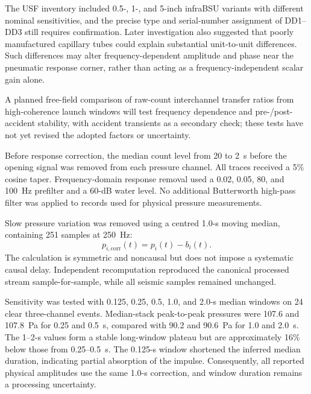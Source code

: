 \documentclass[]{seismica}
\begin{document}
The USF inventory included 0.5-, 1-, and 5-inch infraBSU variants with
different nominal sensitivities, and the precise type and serial-number
assignment of DD1--DD3 still requires confirmation. Later investigation also
suggested that poorly manufactured capillary tubes could explain substantial
unit-to-unit differences. Such differences may alter frequency-dependent
amplitude and phase near the pneumatic response corner, rather than acting as
a frequency-independent scalar gain alone.

A planned free-field comparison of raw-count interchannel transfer ratios
from high-coherence launch windows will test frequency dependence and
pre-/post-accident stability, with accident transients as a secondary check;
these tests have not yet revised the adopted factors or uncertainty.


Before response correction, the median count level from 20 to 2~s before the
opening signal was removed from each pressure channel. All traces received a
5\% cosine taper. Frequency-domain response removal used a 0.02, 0.05, 80, and
100~Hz prefilter and a 60-dB water level. No additional Butterworth high-pass
filter was applied to records used for physical pressure measurements.

Slow pressure variation was removed using a centred 1.0-s moving median,
containing 251 samples at 250~Hz:
\begin{equation}
 p_{i,\mathrm{corr}}(t)=p_i(t)-b_i(t).
\end{equation}
The calculation is symmetric and noncausal but does not impose a systematic
causal delay. Independent recomputation reproduced the canonical processed
stream sample-for-sample, while all seismic samples remained unchanged.

Sensitivity was tested with 0.125, 0.25, 0.5, 1.0, and 2.0-s median windows on
24 clear three-channel events. Median-stack peak-to-peak pressures were 107.6
and 107.8~Pa for 0.25 and 0.5~s, compared with 90.2 and 90.6~Pa for 1.0 and
2.0~s. The 1--2-s values form a stable long-window plateau but are
approximately 16\% below those from 0.25--0.5~s. The 0.125-s window shortened
the inferred median duration, indicating partial absorption of the impulse.
Consequently, all reported physical amplitudes use the same 1.0-s correction,
and window duration remains a processing uncertainty.
\end{document}
